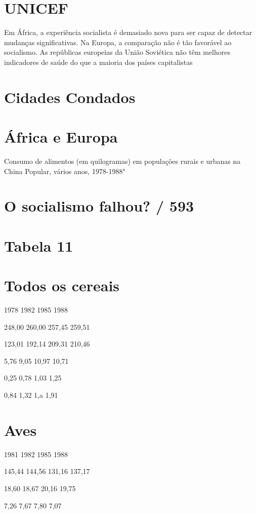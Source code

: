 {{{\section{UNICEF}
 \par 
Em África, a experiência socialista é demasiado nova para ser capaz de detectar mudanças significativas. Na Europa, a comparação não é tão favorável ao socialismo. As repúblicas europeias da União Soviética não têm melhores indicadores de saúde do que a maioria dos países capitalistas
 \par 
\section{Cidades Condados}
 \par 
\section{África e Europa}
 \par 
Consumo de alimentos (em quilogramas) em populações rurais e urbanas na China Popular, vários anos, 1978-1988"
 \par 
\section{O socialismo falhou? / 593}
 \par 
\section{Tabela 11}
 \par 
\section{Todos os cereais}
 \par 
1978 1982 1985 1988
 \par 
248,00 260,00 257,45 259,51
 \par 
123,01 192,14 209,31 210,46
 \par 
5,76 9,05 10,97 10,71
 \par 
0,25 0,78 1,03 1,25
 \par 
0,84 1,32 1,a 1,91
 \par 
\section{Aves}
 \par 
1981 1982 1985 1988
 \par 
145,44 144,56 131,16 137,17
 \par 
18,60 18,67 20,16 19,75
 \par 
7,26 7,67 7,80 7,07
 \par 
}}}
